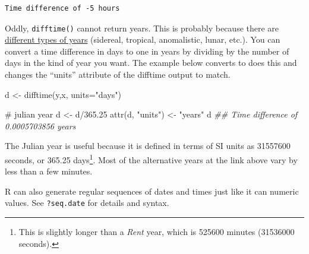 \documentclass[
  13,
  letterpaper,
]{report}
\newenvironment{Shaded}{\begin{snugshade}}{\end{snugshade}}
\newcommand{\AttributeTok}[1]{\textcolor[rgb]{0.40,0.45,0.13}{#1}}
\newcommand{\CommentTok}[1]{\textcolor[rgb]{0.37,0.37,0.37}{#1}}
\newcommand{\DocumentationTok}[1]{\textcolor[rgb]{0.37,0.37,0.37}{\textit{#1}}}
\newcommand{\FloatTok}[1]{\textcolor[rgb]{0.68,0.00,0.00}{#1}}
\newcommand{\FunctionTok}[1]{\textcolor[rgb]{0.28,0.35,0.67}{#1}}
\newcommand{\NormalTok}[1]{\textcolor[rgb]{0.00,0.23,0.31}{#1}}
\newcommand{\OtherTok}[1]{\textcolor[rgb]{0.00,0.23,0.31}{#1}}
\newcommand{\SpecialCharTok}[1]{\textcolor[rgb]{0.37,0.37,0.37}{#1}}
\newcommand{\StringTok}[1]{\textcolor[rgb]{0.13,0.47,0.30}{#1}}
\begin{document}
\begin{verbatim}
Time difference of -5 hours
\end{verbatim}

Oddly, \texttt{difftime()} cannot return years. This is probably because
there are \href{https://en.wikipedia.org/wiki/Year}{different types of
years} (sidereal, tropical, anomalistic, lunar, etc.). You can convert a
time difference in days to one in years by dividing by the number of
days in the kind of year you want. The example below converts to does
this and changes the ``units'' attribute of the difftime output to
match.

\begin{Shaded}
\begin{Highlighting}[]

\NormalTok{d }\OtherTok{\textless{}{-}} \FunctionTok{difftime}\NormalTok{(y,x, }\AttributeTok{units=}\StringTok{"days"}\NormalTok{)}

\CommentTok{\# julian year}
\NormalTok{d }\OtherTok{\textless{}{-}}\NormalTok{ d}\SpecialCharTok{/}\FloatTok{365.25}
\FunctionTok{attr}\NormalTok{(d, }\StringTok{"units"}\NormalTok{) }\OtherTok{\textless{}{-}} \StringTok{"years"}
\NormalTok{d}
\DocumentationTok{\#\# Time difference of 0.0005703856 years}
\end{Highlighting}
\end{Shaded}

The Julian year is useful because it is defined in terms of SI units as
31557600 seconds, or 365.25 days\footnote{This is slightly longer than a
  \emph{Rent} year, which is 525600 minutes (31536000 seconds).}. Most
of the alternative years at the link above vary by less than a few
minutes.

R can also generate regular sequences of dates and times just like it
can numeric values. See \texttt{?seq.date} for details and syntax.
\end{document}
